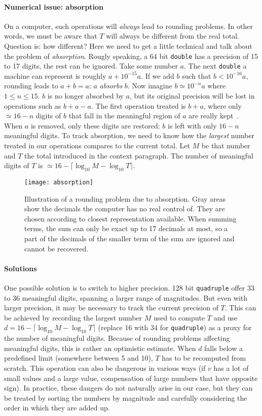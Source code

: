 \paragraph{Numerical issue: absorption} On a computer, such operations will \emph{always} lead to rounding problems. In other words, we must be aware that $T$ will always be different from the real total. Question is: how different? Here we need to get a little technical and talk about the problem of \emph{absorption}. Rougly speaking, a 64 bit \texttt{double} has a precision of 15 to 17 digits, the rest can be ignored. Take some number $a$. The next \texttt{double} a machine can represent is roughly $a + 10^{-15}a$. If we add $b$ such that $b < 10^{-16}a$, rounding leads to $a+b=a$: $a$ \emph{absorbs} $b$. Now imagine $b \simeq 10^{-n}a$ where $1 \leq n \leq 15$. $b$ is no longer absorbed by $a$, but its original precision will be lost in operations such as $b+a-a$. The first operation treated is $b+a$, where only $\simeq 16-n$ digits of $b$ that fall in the meaningful region of $a$ are really kept~. When $a$ is removed, only these digits are restored: $b$ is left with only $16-n$ meaningful digits. To track absorption, we need to know how the \emph{largest} number treated in our operations compares to the current total. Let $M$ be that number and $T$ the total introduced in the context paragraph. The number of meaningful digits of $T$ is $\simeq 16 - \lceil\log_{10}M - \log_{10}T\rceil$.

\begin{figure}[!h]
  \centering
  \texttt{[image: absorption]}
  \caption{Illustration of a rounding problem due to absorption. Gray areas show the decimals the computer has no real control of. They are chosen according to closest representation available. When summing terms, the sum can only be exact up to 17 decimals at most, so a part of the decimals of the smaller term of the sum are ignored and cannot be recovered. }
  \label{fig:absorption}
\end{figure}

\paragraph{Solutions} One possible solution is to switch to higher precision. 128 bit \texttt{quadruple} offer 33 to 36 meaningful digits, spanning a larger range of magnitudes. But even with larger precision, it may be necessary to track the current precision of $T$. This can be achieved by recording the largest number $M$ used to compute $T$ and use $d = 16 - \lceil\log_{10}M - \log_{10}T\rceil$ (replace 16 with 34 for \texttt{quadruple}) as a proxy for the number of meaningful digits. Because of rounding problems affecting meaningful digits, this is rather an optimistic estimate. When $d$ falls below a predefined limit (somewhere between 5 and 10), $T$ has to be recomputed from scratch. This operation can also be dangerous in various ways (if $v$ has a lot of small values and a large value, compensation of large numbers that have opposite sign). In practice, these dangers do not naturally arise in our case, but they can be treated by sorting the numbers by magnitude and carefully considering the order in which they are added up.

